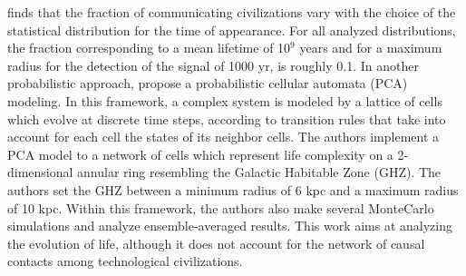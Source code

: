 \documentclass[crop]{CSLB}
\begin{document}
%
%
\citet{balbi_impact_2018} finds that the fraction of communicating
civilizations vary with the choice of the statistical distribution for
the time of appearance. For all analyzed distributions, the fraction
corresponding to a mean lifetime of 10$^9$ years and for a maximum
radius for the detection of the signal of 1000 yr, is roughly 0.1.
%
In another probabilistic approach,
\citet{vukotic_astrobiological_2012} propose a probabilistic cellular
automata (PCA) modeling. In this framework, a complex system is
modeled by a lattice of cells which evolve at discrete time steps,
according to transition rules that take into account for each cell the
states of its neighbor cells.
%
The authors implement a PCA model to a network of cells which
represent life complexity on a 2-dimensional annular ring resembling
the Galactic Habitable Zone (GHZ). 
%
The authors set the GHZ between a minimum radius of 6 kpc and a
maximum radius of 10 kpc. Within this framework, the authors also make
several MonteCarlo simulations and analyze ensemble-averaged results.
%
This work aims at analyzing the evolution of life, although it does
not account for the network of causal contacts among technological
civilizations.
\end{document}
